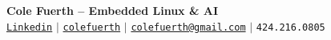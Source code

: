 \begin{center}
    \textbf{\Huge Cole Fuerth -- Embedded Linux \& AI} \\ \vspace{5pt}
    \hspace{1pt} \faLinkedin \hspace{2pt} \href{https://www.linkedin.com/in/cole-fuerth-48344520a/}{\texttt{Linkedin}} \hspace{1pt} $|$
    \hspace{1pt} \faGithub \hspace{2pt} \href{https://github.com/colefuerth}{\texttt{colefuerth}} \hspace{1pt} $|$
    \hspace{1pt} \faEnvelope \hspace{2pt} \href{mailto:colefuerth@gmail.com}{\texttt{colefuerth@gmail.com}} \hspace{1pt} $|$
    \small \faPhone* \texttt{424.216.0805}
    \\ \vspace{-3pt}
  \end{center}